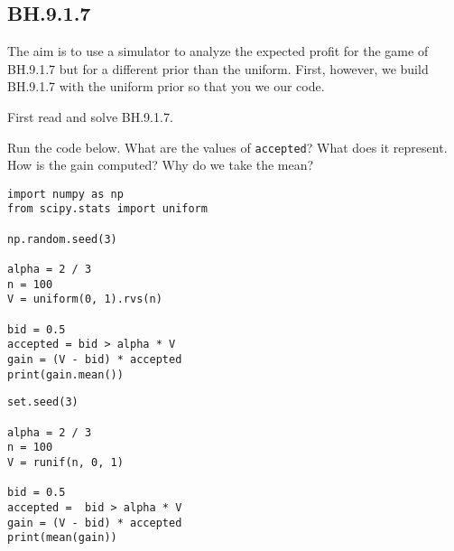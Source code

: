 \subsection{BH.9.1.7}

The aim is to use a simulator to analyze the expected profit for the game of BH.9.1.7 but for a different prior than the uniform.
First, however, we build BH.9.1.7 with the uniform prior so that you we our code.

First read and solve BH.9.1.7.

\begin{exercise}
Run the code below. What are the values of \verb|accepted|? What does it represent. How is the gain computed? Why do we take the mean?
\begin{verbatim}
import numpy as np
from scipy.stats import uniform

np.random.seed(3)

alpha = 2 / 3
n = 100
V = uniform(0, 1).rvs(n)

bid = 0.5
accepted = bid > alpha * V
gain = (V - bid) * accepted
print(gain.mean())
\end{verbatim}

\begin{verbatim}
set.seed(3)

alpha = 2 / 3
n = 100
V = runif(n, 0, 1)

bid = 0.5
accepted =  bid > alpha * V
gain = (V - bid) * accepted
print(mean(gain))
\end{verbatim}
\end{exercise}



